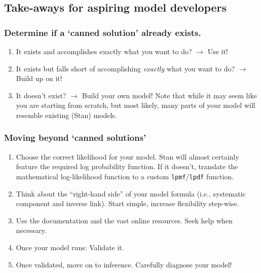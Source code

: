 \documentclass[
  11pt,
]{article}
\providecommand{\tightlist}{%
  \setlength{\itemsep}{0pt}\setlength{\parskip}{0pt}}
\begin{document}
\hypertarget{take-aways-for-aspiring-model-developers}{%
\subsection{Take-aways for aspiring model developers}\label{take-aways-for-aspiring-model-developers}}

\hypertarget{determine-if-a-canned-solution-already-exists.}{%
\subsubsection{Determine if a `canned solution' already exists.}\label{determine-if-a-canned-solution-already-exists.}}

\begin{enumerate}
\def\labelenumi{\arabic{enumi}.}
\tightlist
\item
  It exists and accomplishes exactly what you want to do? \(\rightarrow\) Use it!
\item
  It exists but falls short of accomplishing \emph{exactly} what you want to do? \(\rightarrow\) Build up on it!
\item
  It doesn't exist? \(\rightarrow\) Build your own model! Note that while it may seem like you are starting from scratch, but most likely, many parts of your model will resemble existing (Stan) models.
\end{enumerate}

\hypertarget{moving-beyond-canned-solutions}{%
\subsubsection{Moving beyond `canned solutions'}\label{moving-beyond-canned-solutions}}

\begin{enumerate}
\def\labelenumi{\arabic{enumi}.}
\tightlist
\item
  Choose the correct likelihood for your model. Stan will almost certainly feature the required log probability function. If it doesn't, translate the mathematical log-likelihood function to a custom \texttt{lpmf}/\texttt{lpdf} function.
\item
  Think about the ``right-hand side'' of your model formula (i.e., systematic component and inverse link). Start simple, increase flexibility step-wise.
\item
  Use the documentation and the vast online resources. Seek help when necessary.
\item
  Once your model runs: Validate it.
\item
  Once validated, move on to inference. Carefully diagnose your model!
\end{enumerate}
\end{document}
